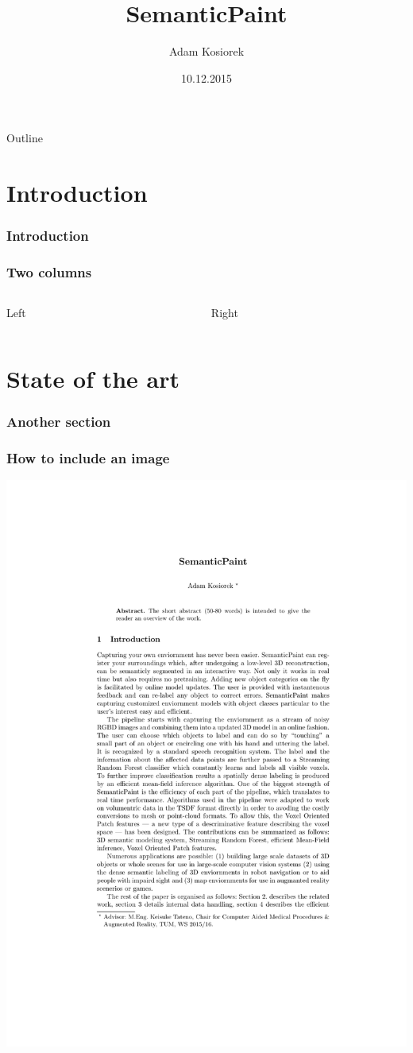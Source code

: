 \documentclass[mathserif]{beamer}
\title[short title]{SemanticPaint}
\author[short presentator]{Adam Kosiorek}
\institute[CAMP]{Computer Aided Medical Procedures \\
Technische Universit\"at M\"unchen}
\date[]{10.12.2015}
\begin{document}

\begin{frame}
\titlepage
\end{frame}


\begin{frame}{Outline}
\tableofcontents
\end{frame}


\section{Introduction}
\begin{frame}
\frametitle{Introduction}

\end{frame}


\begin{frame}
\frametitle{Two columns}
\begin{columns}[t]
\begin{column}{0.45\linewidth}
Left
\end{column}
\begin{column}{0.45\linewidth}
Right
\end{column}
\end{columns}
\end{frame}


\section{State of the art}

\begin{frame}
\frametitle{Another section}
\end{frame}

\begin{frame}
\frametitle{How to include an image}
\begin{center}
\includegraphics[width=0.3\linewidth]{template}
\end{center}
\end{frame}


\end{document}
